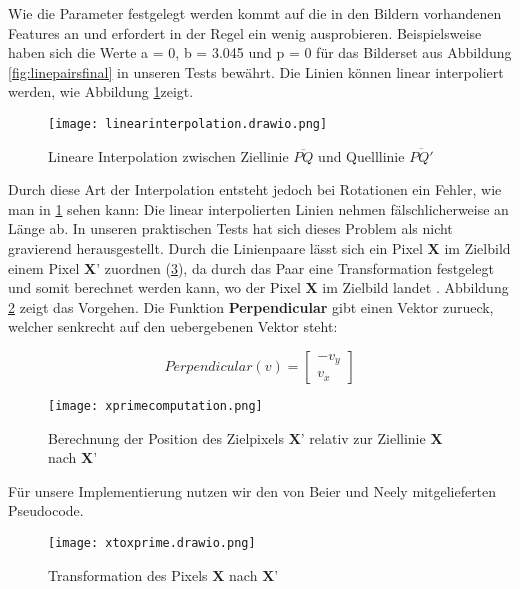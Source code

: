 Wie die Parameter festgelegt werden kommt auf die in den Bildern
vorhandenen Features an und erfordert in der Regel ein wenig
ausprobieren. Beispielsweise haben sich die Werte 
a = 0, b = 3.045 und p = 0 für das Bilderset aus Abbildung
\ref{fig:linepairsfinal} in unseren Tests bewährt.
Die Linien können linear interpoliert werden, wie Abbildung \ref{fig:linearinterpolation}zeigt. 
\begin{figure}[htb]
	\centering
	\texttt{[image: linearinterpolation.drawio.png]}
	\caption{Lineare Interpolation zwischen Ziellinie $\overline{PQ}$ und Quelllinie $\overline{PQ'}$}
	\label{fig:linearinterpolation}
\end{figure}
Durch diese Art der Interpolation entsteht jedoch bei
Rotationen ein Fehler, wie man in \ref{fig:linearinterpolation} sehen kann: Die linear
interpolierten Linien nehmen fälschlicherweise
an Länge ab. In unseren praktischen Tests hat sich
dieses Problem als nicht gravierend herausgestellt. Durch die Linienpaare
lässt sich ein Pixel $\textbf{X}$ im Zielbild einem Pixel $\textbf{X'}$ zuordnen
(\ref{fig:xtoxprime}),
da durch das Paar eine Transformation festgelegt und 
somit berechnet werden kann, wo der Pixel $\textbf{X}$ im Zielbild
landet \cite{beierneely}. Abbildung \ref{fig:xprimecomp} zeigt das
Vorgehen. Die Funktion \textbf{Perpendicular} gibt einen
Vektor zurueck, welcher senkrecht auf den uebergebenen Vektor steht:

\begin{equation}
	Perpendicular(v) = \begin{bmatrix}-v_y\\v_x\end{bmatrix}
\end{equation}

\begin{figure}[htb]
	\centering
	\texttt{[image: xprimecomputation.png]}
	\caption{Berechnung der Position des Zielpixels $\textbf{X'}$ relativ
		zur Ziellinie  $\textbf{X}$ nach $\textbf{X'}$}
	\label{fig:xprimecomp}
\end{figure}
Für unsere Implementierung nutzen wir den von Beier und Neely
mitgelieferten Pseudocode.

\begin{figure}[htb]
	\centering
	\texttt{[image: xtoxprime.drawio.png]}
	\caption{Transformation des Pixels $\textbf{X}$ nach $\textbf{X'}$}
	\label{fig:xtoxprime}
\end{figure}

\clearpage

